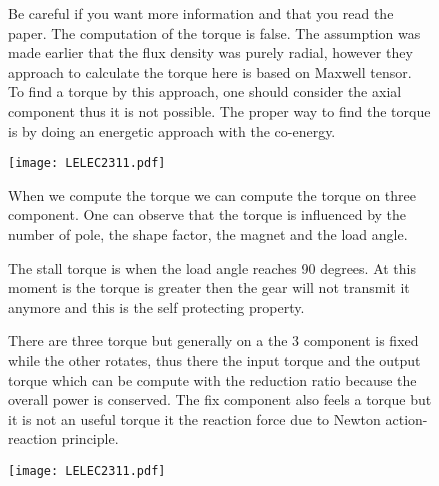 \begin{figure}[H]
    \begin{minipage}{.45\linewidth}
       Be careful if you want more information and that you read the paper. The computation of the torque is false. The assumption was made earlier that the flux density was purely radial, however they approach to calculate the torque here is based on Maxwell tensor. To find a torque by this approach, one should consider the axial component thus it is not possible. The proper way to find the torque is by doing an energetic approach with the co-energy.
    \end{minipage}
    \hfill%
    \begin{minipage}[c]{.45\linewidth}
        \centering
        \texttt{[image: LELEC2311.pdf]}
    \end{minipage}
\end{figure}

\begin{figure}[H]
    \begin{minipage}{.45\linewidth}
        When we compute the torque we can compute the torque on three component. One can observe that the torque is influenced by the number of pole, the shape factor, the magnet and the load angle. 
        
        The stall torque is when the load angle reaches 90 degrees. At this moment is the torque is greater then the gear will not transmit it anymore and this is the self protecting property.
        
        There are three torque but generally on a the 3 component is fixed while the other rotates, thus there the input torque and the output torque which can be compute with the reduction ratio because the overall power is conserved. The fix component also feels a torque but it is not an useful torque it the reaction force due to Newton action-reaction principle. 
    \end{minipage}
    \hfill%
    \begin{minipage}[c]{.45\linewidth}
        \centering
        \texttt{[image: LELEC2311.pdf]}
    \end{minipage}
\end{figure}

